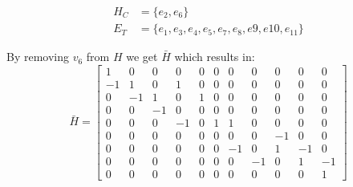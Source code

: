 \begin{equation*} 
	\begin{split}
		H_{C} &= \{e_{2},e_{6}\}   \\ E_{T} &= \{e_1,e_3,e_4,e_5,e_7, e_8, e9, e10 , e_11\}
	\end{split}
\end{equation*}	
	
	By removing $v_{6}$ from $H$ we get $\bar{H}$ which results in:
	\begin{equation}
		\bar{H} = \begin{bmatrix}
			1 & 0 & 0   & 0  & 0  & 0  & 0  & 0  & 0  & 0  & 0 \\
			-1 & 1 & 0  & 1  & 0  & 0  & 0  & 0  & 0  & 0  & 0 \\
			0 & -1 & 1  & 0  & 1  & 0  & 0  & 0  & 0  & 0  & 0 \\
			0 & 0  & -1 & 0  & 0  & 0  & 0  & 0  & 0  & 0  & 0 \\
			0 & 0  & 0  & -1 & 0  & 1  & 1  & 0  & 0  & 0  & 0 \\
			
			0 & 0  & 0  & 0  & 0  & 0  & 0  & 0  & -1 & 0  & 0 \\
			0 & 0  & 0  & 0  & 0  & 0  & -1 & 0  & 1  & -1 & 0 \\
			0 & 0  & 0  & 0  & 0  & 0  & 0  & -1 & 0  & 1  & -1 \\
			0 & 0  & 0  & 0  & 0  & 0  & 0  & 0  & 0  & 0  & 1 
		\end{bmatrix}
	\end{equation}
	
	
	
